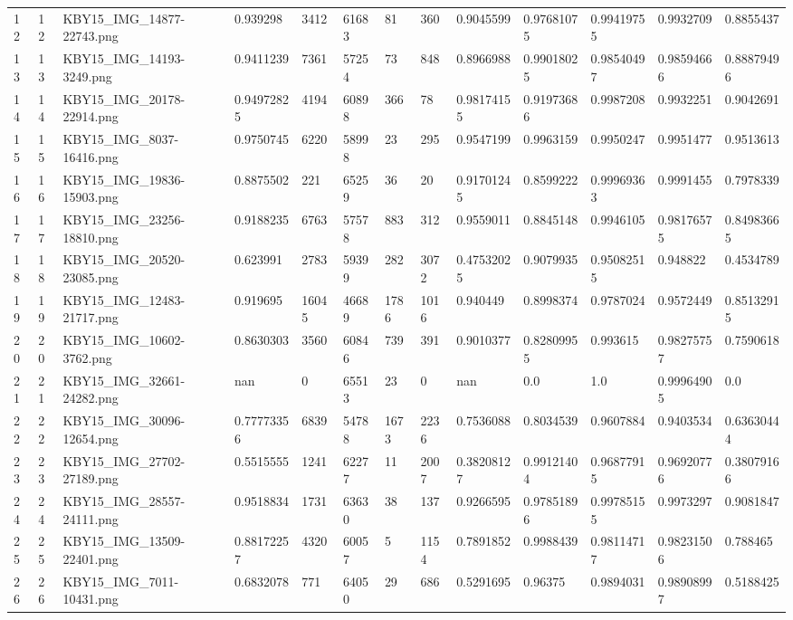 \documentclass[11pt, a4paper, twoside]{report}
\begin{document}
\begin{longtable}[c]{@{}lllllllllllll@{}}
12 & 12 & KBY15\_IMG\_14877-22743.png & 0.939298 & 3412 & 61683 & 81 & 360 & 0.9045599 & 0.97681075 & 0.99419755 & 0.9932709 & 0.8855437 \\
13 & 13 & KBY15\_IMG\_14193-3249.png & 0.9411239 & 7361 & 57254 & 73 & 848 & 0.8966988 & 0.99018025 & 0.98540497 & 0.98594666 & 0.88879496 \\
14 & 14 & KBY15\_IMG\_20178-22914.png & 0.94972825 & 4194 & 60898 & 366 & 78 & 0.98174155 & 0.91973686 & 0.9987208 & 0.9932251 & 0.9042691 \\
15 & 15 & KBY15\_IMG\_8037-16416.png & 0.9750745 & 6220 & 58998 & 23 & 295 & 0.9547199 & 0.9963159 & 0.9950247 & 0.9951477 & 0.9513613 \\
16 & 16 & KBY15\_IMG\_19836-15903.png & 0.8875502 & 221 & 65259 & 36 & 20 & 0.91701245 & 0.8599222 & 0.99969363 & 0.9991455 & 0.7978339 \\
17 & 17 & KBY15\_IMG\_23256-18810.png & 0.9188235 & 6763 & 57578 & 883 & 312 & 0.9559011 & 0.8845148 & 0.9946105 & 0.98176575 & 0.84983665 \\
18 & 18 & KBY15\_IMG\_20520-23085.png & 0.623991 & 2783 & 59399 & 282 & 3072 & 0.47532025 & 0.9079935 & 0.95082515 & 0.948822 & 0.4534789 \\
19 & 19 & KBY15\_IMG\_12483-21717.png & 0.919695 & 16045 & 46689 & 1786 & 1016 & 0.940449 & 0.8998374 & 0.9787024 & 0.9572449 & 0.85132915 \\
20 & 20 & KBY15\_IMG\_10602-3762.png & 0.8630303 & 3560 & 60846 & 739 & 391 & 0.9010377 & 0.82809955 & 0.993615 & 0.98275757 & 0.7590618 \\
21 & 21 & KBY15\_IMG\_32661-24282.png & nan & 0 & 65513 & 23 & 0 & nan & 0.0 & 1.0 & 0.99964905 & 0.0 \\
22 & 22 & KBY15\_IMG\_30096-12654.png & 0.77773356 & 6839 & 54788 & 1673 & 2236 & 0.7536088 & 0.8034539 & 0.9607884 & 0.9403534 & 0.63630444 \\
23 & 23 & KBY15\_IMG\_27702-27189.png & 0.5515555 & 1241 & 62277 & 11 & 2007 & 0.38208127 & 0.99121404 & 0.96877915 & 0.96920776 & 0.38079166 \\
24 & 24 & KBY15\_IMG\_28557-24111.png & 0.9518834 & 1731 & 63630 & 38 & 137 & 0.9266595 & 0.97851896 & 0.99785155 & 0.9973297 & 0.9081847 \\
25 & 25 & KBY15\_IMG\_13509-22401.png & 0.88172257 & 4320 & 60057 & 5 & 1154 & 0.7891852 & 0.9988439 & 0.98114717 & 0.98231506 & 0.788465 \\
26 & 26 & KBY15\_IMG\_7011-10431.png & 0.6832078 & 771 & 64050 & 29 & 686 & 0.5291695 & 0.96375 & 0.9894031 & 0.98908997 & 0.5188425 \\

\end{longtable}
\end{document}
